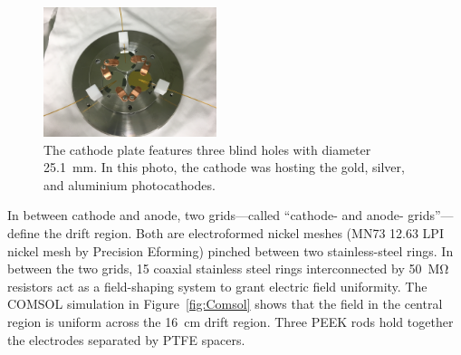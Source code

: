 \documentclass[a4paper,11pt]{article}
\begin{document}
\begin{figure}[t]
	\begin{center}
	\includegraphics[width=0.45\textwidth, trim={35cm 20cm 40cm 20cm}, clip=true]{figures/cathode_plate.JPG}			
	\caption[]{The cathode plate features three blind holes with diameter \SI{25.1}{mm}. In this photo, the cathode was hosting the gold, silver, and aluminium photocathodes.}
	\label{fig:cathode_plate}
	\end{center}	
\end{figure}

In between cathode and anode, two grids---called ``cathode- and anode- grids''---define the drift region. Both are electroformed nickel meshes (MN73 12.63 LPI nickel mesh by Precision Eforming) pinched between two stainless-steel rings. 
In between the two grids, 15 coaxial stainless steel rings interconnected by \SI{50}{\mega\ohm} resistors act as a field-shaping system to grant electric field uniformity. The COMSOL simulation in Figure~\ref{fig:Comsol} shows that the field in the central region is uniform across the \SI{16}{cm} drift region. Three PEEK rods hold together the electrodes separated by PTFE spacers. 
\end{document}
